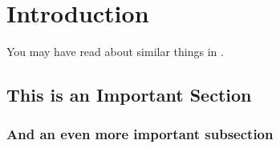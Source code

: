\chapter{Introduction}\label{ch:intro}

You may have read about similar things in \cite{Goodliffe2007}.
\blindtext

\blindtext

\section{This is an Important Section}
\blindtext

\subsection{And an even more important subsection}
\blindtext
